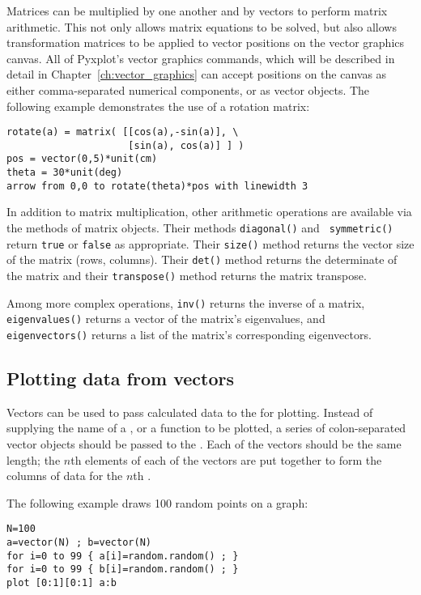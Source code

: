 Matrices can be multiplied by one another and by vectors to perform matrix
arithmetic. This not only allows matrix equations to be solved, but also allows
transformation matrices to be applied to vector positions on the vector
graphics canvas. All of Pyxplot's vector graphics commands, which will be
described in detail in Chapter~\ref{ch:vector_graphics} can accept positions on
the canvas as either comma-separated numerical components, or as vector
objects. The following example demonstrates the use of a rotation matrix:

\begin{verbatim}
rotate(a) = matrix( [[cos(a),-sin(a)], \
                     [sin(a), cos(a)] ] )
pos = vector(0,5)*unit(cm)
theta = 30*unit(deg)
arrow from 0,0 to rotate(theta)*pos with linewidth 3
\end{verbatim}

In addition to matrix multiplication, other arithmetic operations are available
via the methods of matrix objects. Their methods {\tt diagonal()} and {\tt
symmetric()} return {\tt true} or {\tt false} as appropriate. Their {\tt size()}
method returns the vector size of the matrix (rows, columns). Their {\tt det()}
method returns the determinate of the matrix and their {\tt transpose()} method
returns the matrix transpose.

Among more complex operations, {\tt inv()} returns the inverse of a matrix,
{\tt eigen\-values()} returns a vector of the matrix's eigen\-values, and {\tt
eigen\-vectors()} returns a list of the matrix's corresponding eigen\-vectors.

\subsection{Plotting data from vectors}

Vectors can be used to pass calculated data to the  for plotting.
Instead of supplying the name of a \datafile, or a function to be plotted, a
series of colon-separated vector objects should be passed to the
\indcmdt{plot}. Each of the vectors should be the same length; the $n$th
elements of each of the vectors are put together to form the columns of data
for the $n$th \datapoint.

The following example draws 100 random points on a graph:

\begin{verbatim}
N=100
a=vector(N) ; b=vector(N)
for i=0 to 99 { a[i]=random.random() ; }
for i=0 to 99 { b[i]=random.random() ; }
plot [0:1][0:1] a:b
\end{verbatim}

